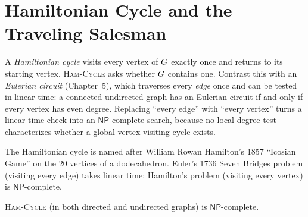 \section{Hamiltonian Cycle and the Traveling Salesman}
\label{ch37:ham-tsp}

A \emph{Hamiltonian cycle} visits every vertex of $G$ exactly once and returns to its starting vertex.
\textsc{Ham-Cycle} asks whether $G$ contains one. Contrast this with an
\emph{Eulerian circuit} (Chapter~5), which traverses every \emph{edge} once and can be tested in
linear time: a connected undirected graph has an Eulerian circuit if and only if every vertex has even degree.
Replacing ``every edge'' with ``every vertex'' turns a linear-time check into an
$\mathsf{NP}$-complete search, because no local degree test characterizes whether a global vertex-visiting cycle exists.

\begin{marginnotebox}
The Hamiltonian cycle is named after William Rowan Hamilton's 1857 ``Icosian Game'' on the $20$ vertices of a dodecahedron. Euler's 1736 Seven Bridges problem (visiting every edge) takes linear time; Hamilton's problem (visiting every vertex) is $\mathsf{NP}$-complete.
\end{marginnotebox}

\begin{theorem}
\label{ch37:thm-ham}
\textsc{Ham-Cycle} (in both directed and undirected graphs) is $\mathsf{NP}$-complete.
\end{theorem}

